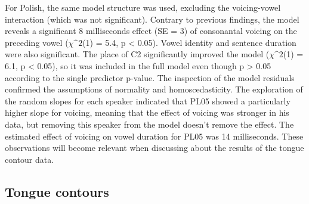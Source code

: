 \documentclass[authoryear, twocolumn]{elsarticle}
\begin{document}
For Polish, the same model structure was used, excluding the
voicing-vowel interaction (which was not significant). Contrary to
previous findings, the model reveals a significant 8 milliseconds effect
(SE = 3) of consonantal voicing on the preceding vowel (\(\chi\^2\)(1) =
5.4, p \textless{} 0.05). Vowel identity and sentence duration were also
significant. The place of C2 significantly improved the model
(\(\chi\^2\)(1) = 6.1, p \textless{} 0.05), so it was included in the
full model even though p \textgreater{} 0.05 according to the single
predictor p-value. The inspection of the model residuals confirmed the
assumptions of normality and homoscedasticity. The exploration of the
random slopes for each speaker indicated that PL05 showed a particularly
higher slope for voicing, meaning that the effect of voicing was
stronger in his data, but removing this speaker from the model doesn't
remove the effect. The estimated effect of voicing on vowel duration for
PL05 was 14 milliseconds. These observations will become relevant when
discussing about the results of the tongue contour data.

\subsection{Tongue contours}\label{tongue-contours}

\label{s:splines}
\end{document}
